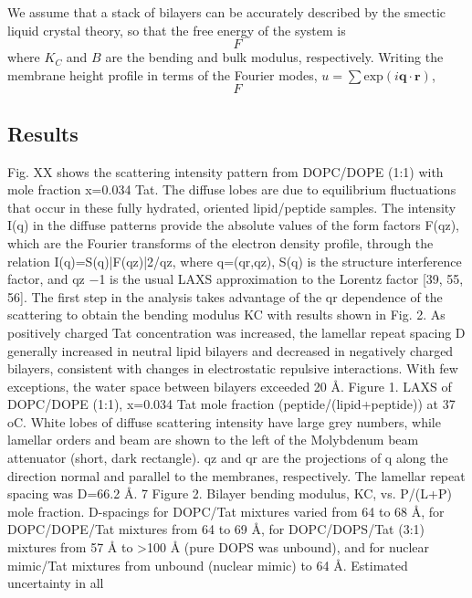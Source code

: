We assume that a stack of bilayers can be accurately
described by the smectic liquid crystal theory, so that the free energy of 
the system is
\begin{equation}
  F
\end{equation}
where $K_C$ and $B$ are the bending and bulk modulus, respectively. 
Writing the membrane height profile in terms of the Fourier modes,
$u=\sum \mathrm{exp}(i\mathbf{q} \cdot \mathbf{r})$, 
\begin{equation}
  F
\end{equation}


\subsection{Results}
Fig. XX shows the scattering intensity pattern from DOPC/DOPE (1:1) with mole 
fraction
x=0.034 Tat. The diffuse lobes are due to equilibrium fluctuations that occur 
in these fully
hydrated, oriented lipid/peptide samples. The intensity I(q) in the diffuse 
patterns provide the
absolute values of the form factors F(qz), which are the Fourier transforms 
of the electron density
profile, through the relation I(q)=S(q)|F(qz)|2/qz, where q=(qr,qz), S(q) is 
the structure
interference factor, and qz
−1 is the usual LAXS approximation to the Lorentz factor [39, 55, 56].
The first step in the analysis takes advantage of the qr dependence of the 
scattering to obtain the
bending modulus KC with results shown in Fig. 2. As positively charged Tat 
concentration was
increased, the lamellar repeat spacing D generally increased in neutral lipid 
bilayers and
decreased in negatively charged bilayers, consistent with changes in 
electrostatic repulsive
interactions. With few exceptions, the water space between bilayers exceeded 
20 Å.
Figure 1. LAXS of DOPC/DOPE (1:1), x=0.034 Tat mole
fraction (peptide/(lipid+peptide)) at 37 oC. White lobes of
diffuse scattering intensity have large grey numbers, while
lamellar orders and beam are shown to the left of the
Molybdenum beam attenuator (short, dark rectangle). qz
and qr are the projections of q along the direction normal
and parallel to the membranes, respectively. The lamellar
repeat spacing was D=66.2 Å.
7
Figure 2. Bilayer bending modulus, KC, vs. P/(L+P) mole fraction. D-spacings 
for DOPC/Tat
mixtures varied from 64 to 68 Å, for DOPC/DOPE/Tat mixtures from 64 to 69 Å, for
DOPC/DOPS/Tat (3:1) mixtures from 57 Å to >100 Å (pure DOPS was unbound), and for
nuclear mimic/Tat mixtures from unbound (nuclear mimic) to 64 Å. Estimated uncertainty in all
